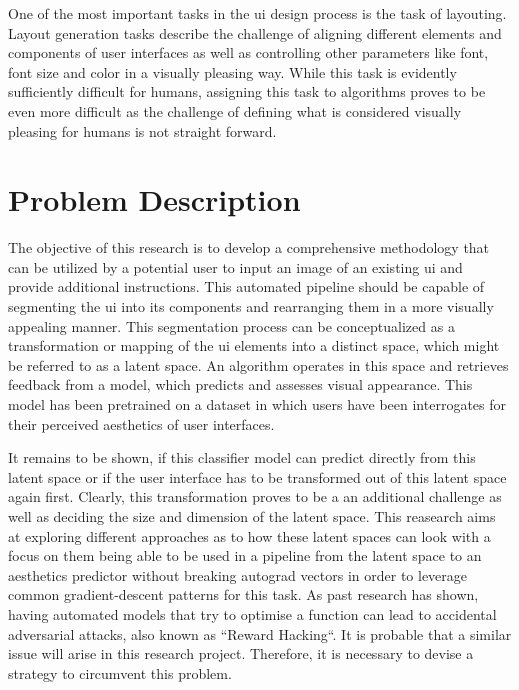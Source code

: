 \documentclass[10pt,a4paper]{scrartcl} %
\begin{document}
One of the most important tasks in the \ac{ui} design process is the task of layouting. Layout generation tasks describe the challenge of aligning different elements and components of user interfaces as well as controlling other parameters like font, font size and color in a visually pleasing way. While this task is evidently sufficiently difficult for humans, assigning this task to algorithms proves to be even more difficult as the challenge of defining what is considered visually pleasing for humans is not straight forward. \cite{LAVIE2004269}

\section{Problem Description}
The objective of this research is to develop a comprehensive methodology that can be utilized by a potential user to input an image of an existing \ac{ui} and provide additional instructions. This automated pipeline should be capable of segmenting the \ac{ui} into its components and rearranging them in a more visually appealing manner. This segmentation process can be conceptualized as a transformation or mapping of the \ac{ui} elements into a distinct space, which might be referred to as a latent space. An algorithm operates in this space and retrieves feedback from a model, which predicts and assesses visual appearance. This model has been pretrained on a dataset in which users have been interrogates for their perceived aesthetics of user interfaces. 
 
 It remains to be shown, if this classifier model can predict directly from this latent space or if the user interface has to be transformed out of this latent space again first. 
 Clearly, this transformation proves to be a an additional challenge as well as deciding the size and dimension of the latent space. This reasearch aims at exploring different approaches as to how these latent spaces can look with a focus on them being able to be used in a pipeline from the latent space to an aesthetics predictor without breaking autograd vectors in order to leverage common gradient-descent patterns for this task.
 As past research has shown, having automated models that try to optimise a function can lead to accidental adversarial attacks, also known as ``Reward Hacking``. \cite{NEURIPS2022_3d719fee} It is probable that a similar issue will arise in this research project. Therefore, it is necessary to devise a strategy to circumvent this problem.
\end{document}
